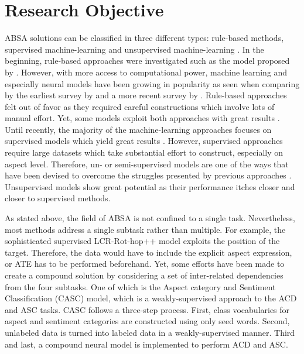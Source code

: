 \documentclass[american, oneside]{ecsgdp}
\begin{document}
\section{Research Objective} \label{sec:objective}
ABSA solutions can be classified in three different types: rule-based methods, supervised machine-learning and unsupervised machine-learning \parencite{Schouten2016Survey}. In the beginning, rule-based approaches were investigated such as the model proposed by \textcite{Hu2004Rules}. However, with more access to computational power, machine learning and especially neural models have been growing in popularity as seen when comparing by the earliest survey by \textcite{Schouten2016Survey} and a more recent survey by \textcite{Zhang2022Survey}. Rule-based approaches felt out of favor as they required careful constructions which involve lots of manual effort. Yet, some models exploit both approaches with great results \parencite{Trusca2020HAABSA++, Meskele2020ALDONAr}. Until recently, the majority of the machine-learning approaches focuses on supervised models which yield great results \parencite{Zhang2022Survey}. However, supervised approaches require large datasets which take substantial effort to construct, especially on aspect level. Therefore, un- or semi-supervised models are one of the ways that have been devised to overcome the struggles presented by previous approaches \parencite{He2017ABAE}. Unsupervised models show great potential as their performance itches closer and closer to supervised methods.

As stated above, the field of ABSA is not confined to a single task. Nevertheless, most methods address a single subtask rather than multiple. For example, the sophisticated supervised LCR-Rot-hop++ \parencite{Trusca2020HAABSA++} model exploits the position of the target. Therefore, the data would have to include the explicit aspect expression, or ATE has to be performed beforehand. Yet, some efforts have been made to create a compound solution by considering a set of inter-related dependencies from the four subtasks. One of which is the Aspect category and Sentiment Classification (CASC) \parencite{Kumar2021CASC} model, which is a weakly-supervised approach to the ACD and ASC tasks. CASC follows a three-step process. First, class vocabularies for aspect and sentiment categories are constructed using only seed words. Second, unlabeled data is turned into labeled data in a weakly-supervised manner. Third and last, a compound neural model is implemented to perform ACD and ASC.
\end{document}
